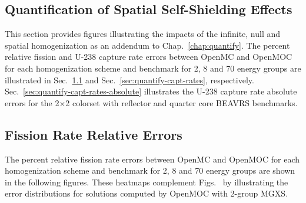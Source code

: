 \begin{appendices}
\chapter{Quantification of Spatial Self-Shielding Effects}
\label{app:quantify-mgxs-shielding}

This section provides figures illustrating the impacts of the infinite, null and spatial homogenization as an addendum to Chap.~\ref{chap:quantify}. The percent relative fission and U-238 capture rate errors between OpenMC and OpenMOC for each homogenization scheme and benchmark for 2, 8 and 70 energy groups are illustrated in Sec.~\ref{sec:quantify-fiss-rates} and Sec.~\ref{sec:quantify-capt-rates}, respectively. Sec.~\ref{sec:quantify-capt-rates-absolute} illustrates the U-238 capture rate absolute errors for the 2$\times$2 colorset with reflector and quarter core \ac{BEAVRS} benchmarks.

\section{Fission Rate Relative Errors}
\label{sec:quantify-fiss-rates}

The percent relative fission rate errors between OpenMC and OpenMOC for each homogenization scheme and benchmark for 2, 8 and 70 energy groups are shown in the following figures. These heatmaps complement Figs.~ by illustrating the error distributions for solutions computed by OpenMOC with 2-group \ac{MGXS}.


\end{appendices}
